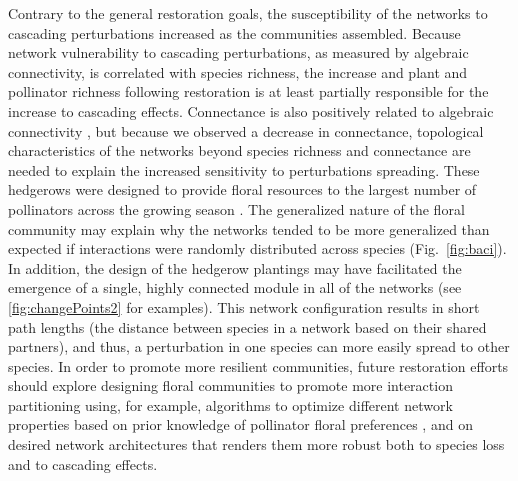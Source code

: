 \documentclass[12pt]{article}
\begin{document}
Contrary to the general restoration goals, the susceptibility of the
networks to cascading perturbations increased as the communities
assembled. Because network vulnerability to cascading perturbations,
as measured by algebraic connectivity, is correlated with species
richness, the increase and plant and pollinator richness following
restoration is at least partially responsible for the increase to
cascading effects. Connectance is also positively related to algebraic
connectivity \citep{gibert2013spatial}, but because we observed a
decrease in connectance, topological characteristics of the networks
beyond species richness and connectance are needed to explain the
increased sensitivity to perturbations spreading. These hedgerows were
designed to provide floral resources to the largest number of
pollinators across the growing season \citep{menz-2010-4}. The
generalized nature of the floral community may explain why the
networks tended to be more generalized than expected if interactions
were randomly distributed across species (Fig.~\ref{fig:baci}). In
addition, the design of the hedgerow plantings may have facilitated
the emergence of a single, highly connected module in all of the
networks (see \ref{fig:changePoints2} for examples). This network
configuration results in short path lengths (the distance between
species in a network based on their shared partners), and thus, a
perturbation in one species can more easily spread to other
species. In order to promote more resilient communities, future
restoration efforts should explore designing floral communities to
promote more interaction partitioning using, for example, algorithms
to optimize different network properties based on prior knowledge of
pollinator floral preferences \citep{mgonigle2016tool}, and on desired
network architectures that renders them more robust both to species
loss and to cascading effects.



\end{document}

